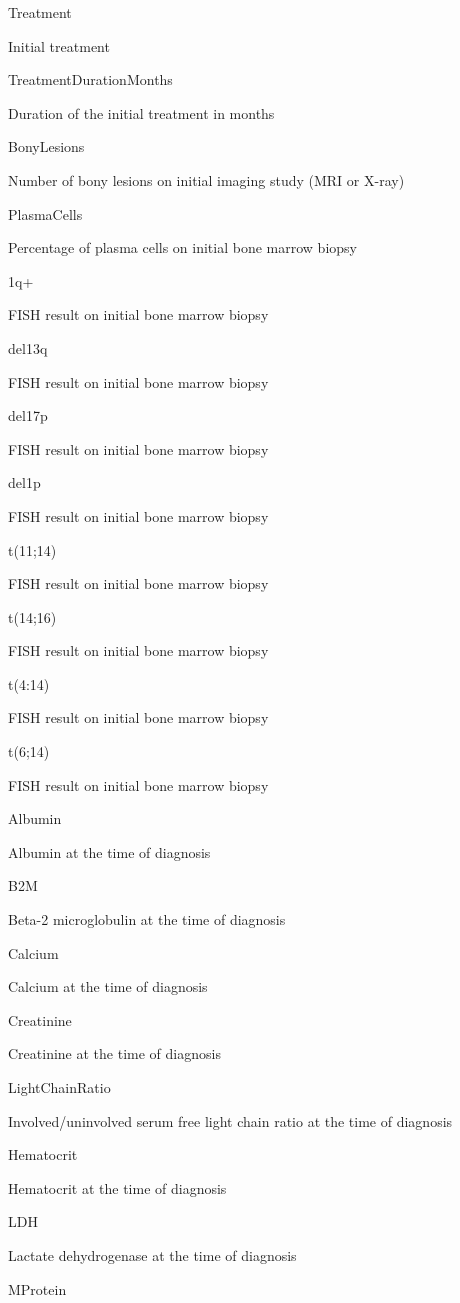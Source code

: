 \documentclass[]{book}
\theoremstyle{definition}
\theoremstyle{definition}
\theoremstyle{definition}
\theoremstyle{remark}
\begin{document}
Treatment

Initial treatment

TreatmentDurationMonths

Duration of the initial treatment in months

BonyLesions

Number of bony lesions on initial imaging study (MRI or X-ray)

PlasmaCells

Percentage of plasma cells on initial bone marrow biopsy

1q+

FISH result on initial bone marrow biopsy

del13q

FISH result on initial bone marrow biopsy

del17p

FISH result on initial bone marrow biopsy

del1p

FISH result on initial bone marrow biopsy

t(11;14)

FISH result on initial bone marrow biopsy

t(14;16)

FISH result on initial bone marrow biopsy

t(4:14)

FISH result on initial bone marrow biopsy

t(6;14)

FISH result on initial bone marrow biopsy

Albumin

Albumin at the time of diagnosis

B2M

Beta-2 microglobulin at the time of diagnosis

Calcium

Calcium at the time of diagnosis

Creatinine

Creatinine at the time of diagnosis

LightChainRatio

Involved/uninvolved serum free light chain ratio at the time of
diagnosis

Hematocrit

Hematocrit at the time of diagnosis

LDH

Lactate dehydrogenase at the time of diagnosis

MProtein
\end{document}
